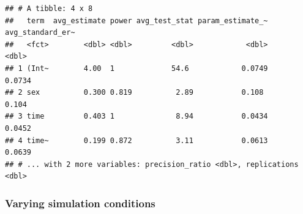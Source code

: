 \documentclass[man]{apa6}
\newenvironment{Shaded}{\begin{snugshade}}{\end{snugshade}}
\newcommand{\DataTypeTok}[1]{\textcolor[rgb]{0.13,0.29,0.53}{#1}}
\newcommand{\KeywordTok}[1]{\textcolor[rgb]{0.13,0.29,0.53}{\textbf{#1}}}
\newcommand{\NormalTok}[1]{#1}
\newcommand{\OperatorTok}[1]{\textcolor[rgb]{0.81,0.36,0.00}{\textbf{#1}}}
\newcommand{\OtherTok}[1]{\textcolor[rgb]{0.56,0.35,0.01}{#1}}
\newcommand{\StringTok}[1]{\textcolor[rgb]{0.31,0.60,0.02}{#1}}
\begin{document}
\begin{Shaded}
\end{Shaded}

\begin{verbatim}
## # A tibble: 4 x 8
##   term  avg_estimate power avg_test_stat param_estimate_~ avg_standard_er~
##   <fct>        <dbl> <dbl>         <dbl>            <dbl>            <dbl>
## 1 (Int~        4.00  1             54.6            0.0749           0.0734
## 2 sex          0.300 0.819          2.89           0.108            0.104 
## 3 time         0.403 1              8.94           0.0434           0.0452
## 4 time~        0.199 0.872          3.11           0.0613           0.0639
## # ... with 2 more variables: precision_ratio <dbl>, replications <dbl>
\end{verbatim}

\hypertarget{varying-simulation-conditions}{%
\subsubsection{Varying simulation conditions}\label{varying-simulation-conditions}}
\end{document}
